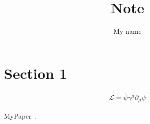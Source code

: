 \documentclass[12pt]{article}
\title{{\bfseries Note}}
\author[1]{My name}
\affil[1]{{\small \textit{My affilation}}}
\date{}
\begin{document}

{\let\newpage\relax\maketitle}

\tableofcontents




\section{Section 1}
\label{sec:sec1}

\begin{align}
  \mathcal{L} = \bar\psi \gamma^\mu \partial_\mu\psi
\end{align}

MyPaper~\cite{Yanagi:2019vrr}.


\end{document}
